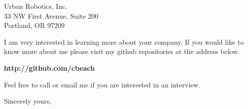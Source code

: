 \documentclass{letter} %
\begin{document}
\begin{letter}{Urban Robotics, Inc. \\
33 NW First Avenue, Suite 200 \\
Portland, OR 97209 }
\begin{flushleft}
\noindent I am very interested in learning more about your company.  
If you would like to know more about me please visit my github repositories at the address below. \\ 

\end{flushleft}
\begin{center}
	\textbf{http://github.com/cbeach}
\end{center}

Feel free to call or email me if you are interested in an interview.

\closing{Sincerely yours,} 
 

 

\end{letter}
 
\end{document}
